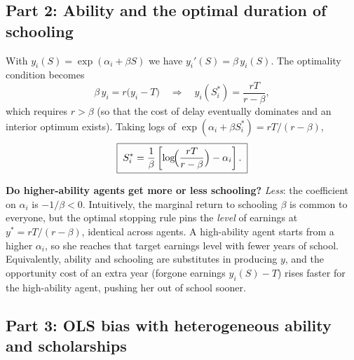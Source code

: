 \documentclass[11pt,english]{article}
\begin{document}
\subsection*{Part 2: Ability and the optimal duration of schooling}

With $y_{i}(S)=\exp(\alpha_{i}+\beta S)$ we have $y_{i}'(S)=\beta\,y_{i}(S)$.
The optimality condition becomes
\begin{equation}
\beta\,y_{i}=r\bigl(y_{i}-T\bigr)
\quad\Longrightarrow\quad
y_{i}(S_{i}^{*})=\frac{rT}{r-\beta},
\end{equation}
which requires $r>\beta$ (so that the cost of delay eventually dominates and an
interior optimum exists). Taking logs of
$\exp(\alpha_{i}+\beta S_{i}^{*})=rT/(r-\beta)$,
\begin{equation}\boxed{\;
S_{i}^{*}=\frac{1}{\beta}\left[\log\!\Bigl(\frac{rT}{r-\beta}\Bigr)-\alpha_{i}\right].
\;}\end{equation}

\textbf{Do higher-ability agents get more or less schooling?} \emph{Less}: the
coefficient on $\alpha_{i}$ is $-1/\beta<0$. Intuitively, the marginal return to
schooling $\beta$ is common to everyone, but the optimal stopping rule pins the
\emph{level} of earnings at $y^{*}=rT/(r-\beta)$, identical across agents. A
high-ability agent starts from a higher $\alpha_{i}$, so she reaches that target
earnings level with fewer years of school. Equivalently, ability and schooling
are substitutes in producing $y$, and the opportunity cost of an extra year
(forgone earnings $y_i(S)-T$) rises faster for the high-ability agent, pushing
her out of school sooner.

\subsection*{Part 3: OLS bias with heterogeneous ability and scholarships}
\end{document}
